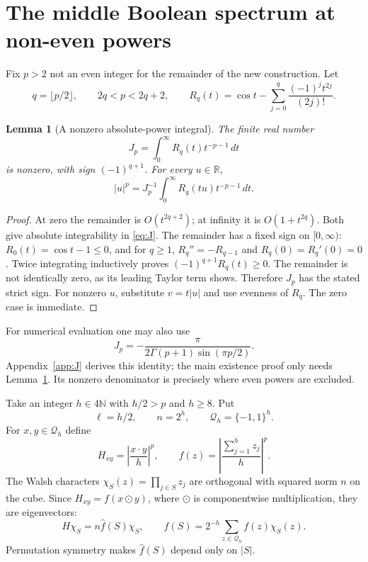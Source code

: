 \documentclass[11pt]{article}
\newtheorem{lemma}[theorem]{Lemma}
\theoremstyle{remark}\newtheorem{remark}[theorem]{Remark}
\newcommand{\R}{\mathbb R}\newcommand{\E}{\mathbb E}\newcommand{\Prob}{\mathbb P}
\begin{document}
\section{The middle Boolean spectrum at non-even powers}\label{sec:fourier}
Fix $p>2$ not an even integer for the remainder of the new construction. Let
\[
 q=\lfloor p/2\rfloor,\qquad 2q<p<2q+2,
 \qquad R_q(t)=\cos t-\sum_{j=0}^q\frac{(-1)^jt^{2j}}{(2j)!}.
\]
\begin{lemma}[A nonzero absolute-power integral]\label{lem:J}
The finite real number
\begin{equation}\label{eq:J}
 J_p=\int_0^\infty R_q(t)t^{-p-1}\,dt
\end{equation}
is nonzero, with sign $(-1)^{q+1}$. For every $u\in\R$,
\begin{equation}\label{eq:absintegral}
 |u|^p=J_p^{-1}\int_0^\infty R_q(tu)t^{-p-1}\,dt.
\end{equation}
\end{lemma}
\begin{proof}
At zero the remainder is $O(t^{2q+2})$; at infinity it is $O(1+t^{2q})$. Both give absolute integrability in \eqref{eq:J}. The remainder has a fixed sign on $[0,\infty)$: $R_0(t)=\cos t-1\le0$, and for $q\ge1$,
$R_q''=-R_{q-1}$ and $R_q(0)=R_q'(0)=0$. Twice integrating inductively proves $(-1)^{q+1}R_q(t)\ge0$. The remainder is not identically zero, as its leading Taylor term shows. Therefore $J_p$ has the stated strict sign. For nonzero $u$, substitute $v=t|u|$ and use evenness of $R_q$. The zero case is immediate.
\end{proof}
For numerical evaluation one may also use
\begin{equation}\label{eq:Jgamma}
 J_p=-\frac{\pi}{2\Gamma(p+1)\sin(\pi p/2)}.
\end{equation}
Appendix~\ref{app:J} derives this identity; the main existence proof only needs Lemma~\ref{lem:J}. Its nonzero denominator is precisely where even powers are excluded.

Take an integer $h\in4\mathbb N$ with $h/2>p$ and $h\ge8$. Put
\[
 \ell=h/2,\qquad n=2^h,\qquad \mathcal Q_h=\{-1,1\}^h.
\]
For $x,y\in\mathcal Q_h$ define
\begin{equation}\label{eq:H}
 H_{xy}=\left|\frac{x\cdot y}{h}\right|^p,
 \qquad f(z)=\left|\frac{\sum_{j=1}^h z_j}{h}\right|^p.
\end{equation}
The Walsh characters $\chi_S(z)=\prod_{j\in S}z_j$ are orthogonal with squared norm $n$ on the cube. Since $H_{xy}=f(x\odot y)$, where $\odot$ is componentwise multiplication, they are eigenvectors:
\[
 H\chi_S=n\widehat f(S)\chi_S,
 \qquad \widehat f(S)=2^{-h}\sum_{z\in\mathcal Q_h}f(z)\chi_S(z).
\]
Permutation symmetry makes $\widehat f(S)$ depend only on $|S|$.
\end{document}
